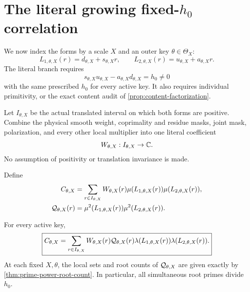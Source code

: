 \section{The literal growing fixed-\texorpdfstring{\(h_0\)}{h0}
correlation}
\label{sec:physical-interface}

We now index the forms by a scale \(X\) and an outer key
\(\theta\in\Theta_X\):
\begin{equation}
 L_{1,\theta,X}(r)
 =d_{\theta,X}+s_{\theta,X}r,\qquad
 L_{2,\theta,X}(r)
 =u_{\theta,X}+a_{\theta,X}r.
\label{eq:growing-affine-family}
\end{equation}
The literal branch requires
\begin{equation}
 s_{\theta,X}u_{\theta,X}
 -a_{\theta,X}d_{\theta,X}
 =h_0\ne0
\label{eq:growing-fixed-determinant}
\end{equation}
with the same prescribed \(h_0\) for every active key.  It also
requires individual primitivity, or the exact content audit of
\cref{prop:content-factorization}.

Let \(I_{\theta,X}\) be the actual translated interval on which both
forms are positive.  Combine the physical smooth weight,
coprimality and residue masks, joint mask, polarization, and every
other local multiplier into one literal coefficient
\[
 W_{\theta,X}:I_{\theta,X}\to\mathbb C.
\]
No assumption of positivity or translation invariance is made.

\begin{definition}
\label{def:literal-parity-correlation}
Define
\begin{align}
 C_{\theta,X}
 &=
 \sum_{r\in I_{\theta,X}}
 W_{\theta,X}(r)
 \mu(L_{1,\theta,X}(r))
 \mu(L_{2,\theta,X}(r)),
\label{eq:literal-mobius-correlation}\\
 \mathcal Q_{\theta,X}(r)
 &=
 \mu^2(L_{1,\theta,X}(r))
 \mu^2(L_{2,\theta,X}(r)).
\label{eq:literal-squarefree-support}
\end{align}
\end{definition}

\begin{theorem}
\label{thm:literal-local-parity-split}
For every active key,
\begin{equation}
 \boxed{
 C_{\theta,X}
 =
 \sum_{r\in I_{\theta,X}}
 W_{\theta,X}(r)\mathcal Q_{\theta,X}(r)
 \lambda(L_{1,\theta,X}(r))
 \lambda(L_{2,\theta,X}(r)).}
\label{eq:literal-local-parity-split}
\end{equation}
At each fixed \(X,\theta\), the local sets and root counts of
\(\mathcal Q_{\theta,X}\) are given exactly by
\cref{thm:prime-power-root-count}.  In particular, all simultaneous
root primes divide \(h_0\).
\end{theorem}

